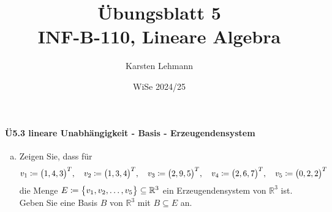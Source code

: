 \documentclass{scrreprt}
\author{Karsten Lehmann}
\date{WiSe 2024/25}
\title{Übungsblatt 5\\INF-B-110, Lineare Algebra}
\begin{document}
\paragraph{Ü5.3 lineare Unabhängigkeit - Basis - Erzeugendensystem}

\begin{enumerate}[(a)]
\item Zeigen Sie, dass für
  \[
    v_1 \coloneqq \qty\big(1, 4, 3)^T, \quad
    v_2 \coloneqq \qty\big(1, 3, 4)^T, \quad
    v_3 \coloneqq \qty\big(2, 9, 5)^T, \quad
    v_4 \coloneqq \qty\big(2, 6, 7)^T, \quad
    v_5 \coloneqq \qty\big(0, 2, 2)^T
  \]
  die Menge $E \coloneqq \qty\big{v_1, v_2, \ldots, v_5} \subseteq \mathbb{R}^3$
  ein Erzeugendensystem von $\mathbb{R}^3$ ist.
  Geben Sie eine Basis $B$ von $\mathbb{R}^3$ mit $B \subseteq E$ an.


\end{enumerate}
\end{document}
